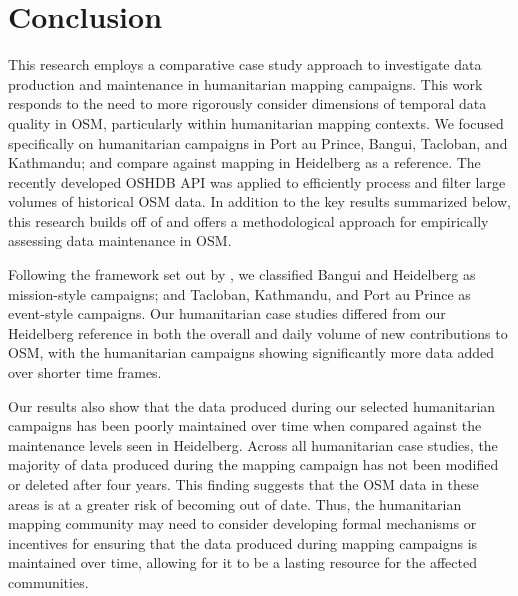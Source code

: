 \chapter{Conclusion}
\label{chapterlabel7}

This research employs a comparative case study approach to investigate data production and maintenance in humanitarian mapping campaigns. This work responds to the need to more rigorously consider dimensions of temporal data quality in OSM, particularly within humanitarian mapping contexts. We focused specifically on humanitarian campaigns in Port au Prince, Bangui, Tacloban, and Kathmandu; and compare against mapping in Heidelberg as a reference. The recently developed OSHDB API was applied to efficiently process and filter large volumes of historical OSM data. In addition to the key results summarized below, this research builds off of \textcite{quattrone_work_2017} and offers a methodological approach for empirically assessing data maintenance in OSM.  

Following the framework set out by \textcite{dittus_mass_2017}, we classified Bangui and Heidelberg as mission-style campaigns; and Tacloban, Kathmandu, and Port au Prince as event-style campaigns. Our humanitarian case studies differed from our Heidelberg reference in both the overall and daily volume of new contributions to OSM, with the humanitarian campaigns showing significantly more data added over shorter time frames. 

Our results also show that the data produced during our selected humanitarian campaigns has been poorly maintained over time when compared against the maintenance levels seen in Heidelberg. Across all humanitarian case studies, the majority of data produced during the mapping campaign has not been modified or deleted after four years. This finding suggests that the OSM data in these areas is at a greater risk of becoming out of date. Thus, the humanitarian mapping community may need to consider developing formal mechanisms or incentives for ensuring that the data produced during mapping campaigns is maintained over time, allowing for it to be a lasting resource for the affected communities. 


